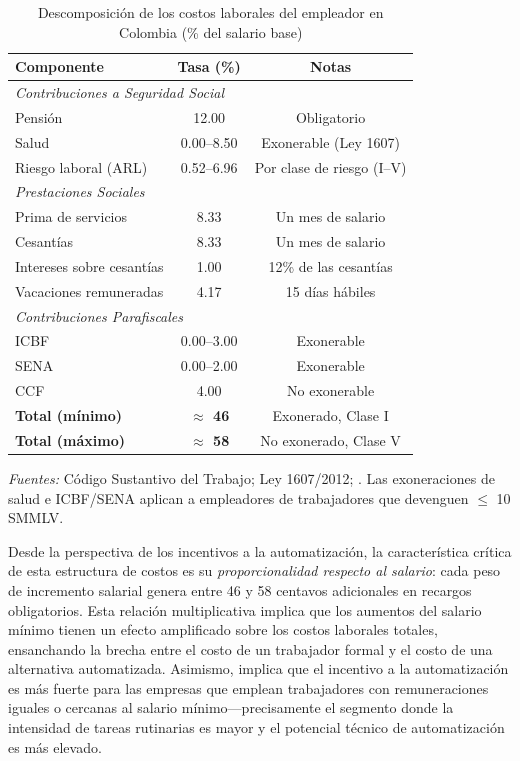\documentclass{article}
\begin{document}
\begin{table}[htbp]
\centering
\caption{Descomposici\'on de los costos laborales del empleador en Colombia (\% del salario base)}
\label{tab:cost_breakdown}
\begin{threeparttable}
\begin{tabular}{lcc}
\toprule
\textbf{Componente} & \textbf{Tasa (\%)} & \textbf{Notas} \\
\midrule
\multicolumn{3}{l}{\textit{Contribuciones a Seguridad Social}} \\
\quad Pensi\'on & 12.00 & Obligatorio \\
\quad Salud & 0.00--8.50 & Exonerable (Ley 1607) \\
\quad Riesgo laboral (ARL) & 0.52--6.96 & Por clase de riesgo (I--V) \\
\midrule
\multicolumn{3}{l}{\textit{Prestaciones Sociales}} \\
\quad Prima de servicios & 8.33 & Un mes de salario \\
\quad Cesant\'ias & 8.33 & Un mes de salario \\
\quad Intereses sobre cesant\'ias & 1.00 & 12\% de las cesant\'ias \\
\quad Vacaciones remuneradas & 4.17 & 15 d\'ias h\'abiles \\
\midrule
\multicolumn{3}{l}{\textit{Contribuciones Parafiscales}} \\
\quad ICBF & 0.00--3.00 & Exonerable \\
\quad SENA & 0.00--2.00 & Exonerable \\
\quad CCF & 4.00 & No exonerable \\
\midrule
\textbf{Total (m\'inimo)} & \textbf{$\approx$ 46} & Exonerado, Clase I \\
\textbf{Total (m\'aximo)} & \textbf{$\approx$ 58} & No exonerado, Clase V \\
\bottomrule
\end{tabular}
\begin{tablenotes}
\small
\item \textit{Fuentes:} C\'odigo Sustantivo del Trabajo; Ley 1607/2012; \cite{anif2018}. Las exoneraciones de salud e ICBF/SENA aplican a empleadores de trabajadores que devenguen $\leq$ 10 SMMLV.
\end{tablenotes}
\end{threeparttable}
\end{table}

Desde la perspectiva de los incentivos a la automatizaci\'on, la caracter\'istica cr\'itica de esta estructura de costos es su \textit{proporcionalidad respecto al salario}: cada peso de incremento salarial genera entre 46 y 58 centavos adicionales en recargos obligatorios. Esta relaci\'on multiplicativa implica que los aumentos del salario m\'inimo tienen un efecto amplificado sobre los costos laborales totales, ensanchando la brecha entre el costo de un trabajador formal y el costo de una alternativa automatizada. Asimismo, implica que el incentivo a la automatizaci\'on es m\'as fuerte para las empresas que emplean trabajadores con remuneraciones iguales o cercanas al salario m\'inimo---precisamente el segmento donde la intensidad de tareas rutinarias es mayor y el potencial t\'ecnico de automatizaci\'on es m\'as elevado.
\end{document}
